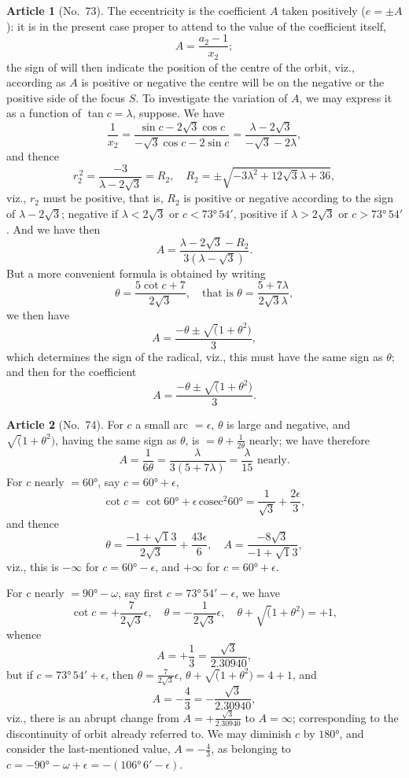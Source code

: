 \documentclass[11pt,a4paper]{article}
\theoremstyle{definition}
\newtheorem{art}{Article}
\begin{document}
\begin{art}[No.~73]
The eccentricity is the coefficient $A$ taken positively ($e = \pm A$): it is in the present case proper to attend to the value of the coefficient itself,
\[
A = \frac{a_2 - 1}{x_2};
\]
the sign of will then indicate the position of the centre of the orbit, viz., according as $A$ is positive or negative the centre will be on the negative or the positive side of the focus $S$. To investigate the variation of $A$, we may express it as a function of $\tan c = \lambda$, suppose. We have
\[
\frac{1}{x_2} = \frac{\sin c - 2\surd 3 \cos c}{-\surd 3 \cos c - 2 \sin c} = \frac{\lambda - 2\surd 3}{-\surd 3 - 2\lambda},
\]
and thence
\[
r_2^{\,2} = \frac{-3}{\lambda - 2\surd 3} = R_2, \quad R_2 = \pm \sqrt{-3\lambda^2 + 12\surd 3\lambda + 36},
\]
viz., $r_2$ must be positive, that is, $R_2$ is positive or negative according to the sign of $\lambda - 2\surd 3$; negative if $\lambda < 2\surd 3$ or $c < 73°\, 54'$, positive if $\lambda > 2\surd 3$ or $c > 73°\, 54'$. And we have then
\[
A = \frac{\lambda - 2\surd 3 - R_2}{3(\lambda - \surd 3)}.
\]
But a more convenient formula is obtained by writing
\[
\theta = \frac{5\cot c + 7}{2\surd 3}, \quad \text{that is } \theta = \frac{5 + 7\lambda}{2\surd 3\lambda},
\]
we then have
\[
A = \frac{-\theta \pm \surd(1 + \theta^2)}{3},
\]
which determines the sign of the radical, viz., this must have the same sign as $\theta$; and then for the coefficient
\[
A = \frac{-\theta \pm \surd(1 + \theta^2)}{3}.
\]
\end{art}

\begin{art}[No.~74]
For $c$ a small arc $= \epsilon$, $\theta$ is large and negative, and $\surd(1 + \theta^2)$, having the same sign as $\theta$, is $= \theta + \frac{1}{2\theta}$ nearly; we have therefore
\[
A = \frac{1}{6\theta} = \frac{\lambda}{3(5 + 7\lambda)} = \frac{\lambda}{15} \text{ nearly}.
\]
For $c$ nearly $= 60°$, say $c = 60° + \epsilon$,
\[
\cot c = \cot 60° + \epsilon \, \text{cosec}^2 60° = \frac{1}{\surd 3} + \frac{2\epsilon}{3},
\]
and thence
\[
\theta = \frac{-1 + \surd 13}{2\surd 3} + \frac{43\epsilon}{6}, \quad A = \frac{-8\surd 3}{-1 + \surd 13},
\]
viz., this is $-\infty$ for $c = 60° - \epsilon$, and $+\infty$ for $c = 60° + \epsilon$.

For $c$ nearly $= 90° - \omega$, say first $c = 73°\, 54' - \epsilon$, we have
\[
\cot c = +\frac{7}{2\surd 3}\epsilon, \quad \theta = -\frac{1}{2\surd 3}\epsilon, \quad \theta + \surd(1 + \theta^2) = +1,
\]
whence
\[
A = +\frac{1}{3} = \frac{\surd 3}{2.30940},
\]
but if $c = 73°\, 54' + \epsilon$, then $\theta = \frac{7}{2\surd 3}\epsilon$, $\theta + \surd(1 + \theta^2) = 4 + 1$, and
\[
A = -\frac{4}{3} = -\frac{\surd 3}{2.30940},
\]
viz., there is an abrupt change from $A = +\frac{\surd 3}{2.30940}$ to $A = \infty$; corresponding to the discontinuity of orbit already referred to. We may diminish $c$ by $180°$, and consider the last-mentioned value, $A = -\frac{4}{3}$, as belonging to $c = -90° - \omega + \epsilon = -(106°\, 6' - \epsilon)$.
\end{art}
\end{document}

